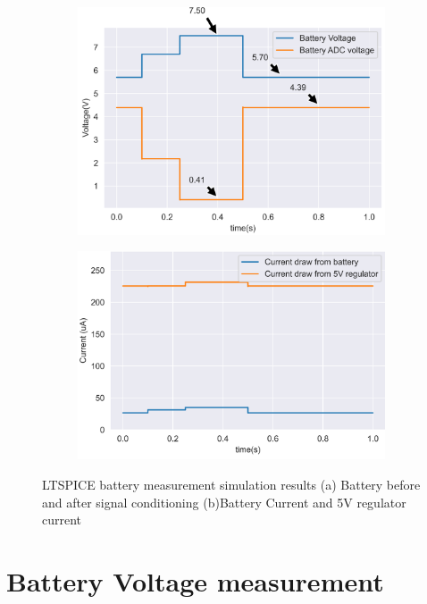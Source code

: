 \begin{figure}[!htb]
	\footnotesize
	\centering
	\begin{subfigure}[]{0.46\textwidth}
		\centering
		\includegraphics[width=1\linewidth]{./Figures/A6/A6batvolt.png}
		\caption{} \label{subfig:voltbatA6}
	\end{subfigure}
	\begin{subfigure}[]{0.46\textwidth}
		\centering
		\includegraphics[width=1\linewidth]{./Figures/A6/A6batcurrent.png}
		\caption{ } \label{subfig:currbatA6}
	\end{subfigure}
	\caption[{LTSPICE battery measurement simulation results}]{LTSPICE battery measurement simulation results   (a)  Battery before and after signal conditioning (b)Battery Current and 5V regulator current }
	\label{fig:A6bat}
\end{figure}

\newpage
\section{Battery Voltage measurement}




















